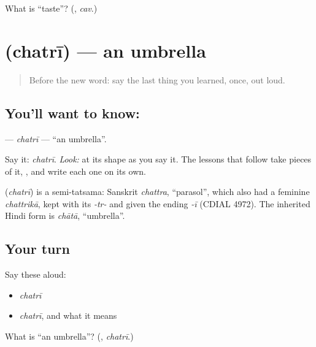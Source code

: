 \begin{tcolorbox}[breakable,colback=teal!4,colframe=teal!35!black,title={Before you move on}]
What is \textquotedblleft{}taste\textquotedblright{}? (\textbf{}, \emph{cav}.)
\end{tcolorbox}
\section[\texorpdfstring{\mr{छत्री} (chatrī)}{छत्री (chatrī)}]{ (chatrī) — an umbrella}

\label{lesson:MR-C06-chatri}



\begin{quote}
Before the new word: say the last thing you learned, once, out loud.
\end{quote}

\subsection*{You'll want to know: }
\textbf{} — \emph{chatrī} — \textquotedblleft{}an umbrella\textquotedblright{}.

Say it: \emph{chatrī}. \emph{Look:} at its shape as you say it. The lessons that follow take pieces of it, \textbf{}, and write each one on its own.

\begin{cousinweb}
\textbf{} (\emph{chatrī}) is a semi-tatsama: Sanskrit \emph{chattra}, \textquotedblleft{}parasol\textquotedblright{}, which also had a feminine \emph{chattrikā}, kept with its \emph{-tr-} and given the ending \emph{-ī} (CDIAL 4972). The inherited Hindi form is \emph{chātā}, \textquotedblleft{}umbrella\textquotedblright{}.
\end{cousinweb}

\subsection*{Your turn}
Say these aloud:

\begin{itemize}
\raggedright
  \item \emph{chatrī}
  \item \emph{chatrī}, and what it means
\end{itemize}

\begin{tcolorbox}[breakable,colback=teal!4,colframe=teal!35!black,title={Before you move on}]
What is \textquotedblleft{}an umbrella\textquotedblright{}? (\textbf{}, \emph{chatrī}.)
\end{tcolorbox}
